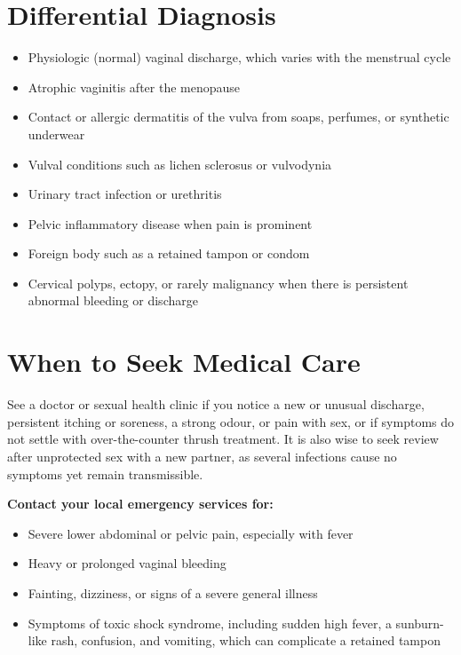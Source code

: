 \section*{Differential Diagnosis}
\begin{itemize}
    \item Physiologic (normal) vaginal discharge, which varies with the menstrual cycle
    \item Atrophic vaginitis after the menopause
    \item Contact or allergic dermatitis of the vulva from soaps, perfumes, or synthetic underwear
    \item Vulval conditions such as lichen sclerosus or vulvodynia
    \item Urinary tract infection or urethritis
    \item Pelvic inflammatory disease when pain is prominent
    \item Foreign body such as a retained tampon or condom
    \item Cervical polyps, ectopy, or rarely malignancy when there is persistent abnormal bleeding or discharge
\end{itemize}

\section*{When to Seek Medical Care}
See a doctor or sexual health clinic if you notice a new or unusual discharge, persistent itching or soreness, a strong odour, or pain with sex, or if symptoms do not settle with over-the-counter thrush treatment. It is also wise to seek review after unprotected sex with a new partner, as several infections cause no symptoms yet remain transmissible.

\textbf{Contact your local emergency services for:}
\begin{itemize}
    \item Severe lower abdominal or pelvic pain, especially with fever
    \item Heavy or prolonged vaginal bleeding
    \item Fainting, dizziness, or signs of a severe general illness
    \item Symptoms of toxic shock syndrome, including sudden high fever, a sunburn-like rash, confusion, and vomiting, which can complicate a retained tampon
\end{itemize}

